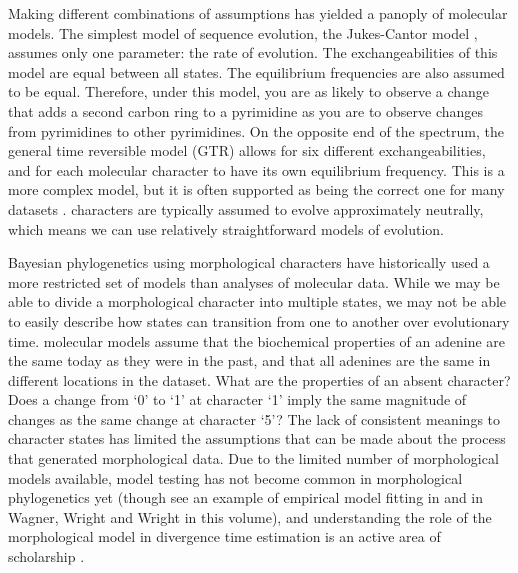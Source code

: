 Making different combinations of assumptions has yielded a panoply of molecular models.
The simplest model of sequence evolution, the Jukes-Cantor model \citep{Jukes1969}, assumes only one parameter: the rate of evolution.
The exchangeabilities of this model are equal between all states.
The equilibrium frequencies are also assumed to be equal.
Therefore, under this model, you are as likely to observe a change that adds a second carbon ring to a pyrimidine as you are to observe changes from pyrimidines to other pyrimidines.
On the opposite end of the spectrum, the general time reversible model (GTR) \citep{Tavare1986} allows for six different exchangeabilities, and for each molecular character to have its own equilibrium frequency.
This is a more complex model, but it is often supported as being the correct one for many datasets \citep{abadi2019}.
 characters are typically assumed to evolve approximately neutrally, which means we can use relatively straightforward models of evolution.

Bayesian phylogenetics using morphological characters have historically used a more restricted set of models than analyses of molecular data.
While we may be able to divide a  morphological character into multiple states, we may not be able to easily describe how states can transition from one to another over evolutionary time.
 molecular models assume that the biochemical properties of an adenine are the same today as they were in the past, and
that all adenines are the same in different locations in the dataset.
What are the properties of an absent  character?
Does a change from  `0' to `1' at character `1' imply the same magnitude of changes as the same change  at character `5'?
The lack of consistent meanings to character states has limited the assumptions that can be made about the process that generated morphological data.
Due to the limited number of morphological models available, model testing has not become common in morphological phylogenetics yet (though see an example of empirical model fitting in \cite*{bapst2017} and in Wagner, Wright and Wright in this volume), and understanding the role of the morphological model in divergence time estimation is an active area of scholarship \citep{Klopfstein2019}.

